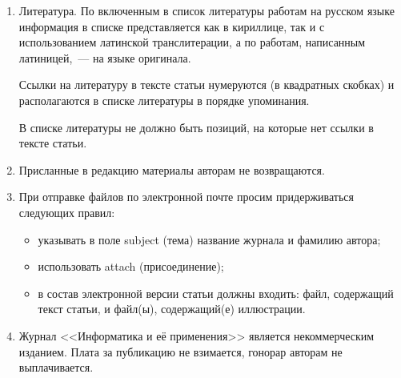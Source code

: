 {\begin{enumerate}[1.]
\begin{itemize}
\pagebreak  

\thispagestyle{empty}


\vspace*{-36pt}


\item сведения об авторах, в соответствии с форматом, образцы которого 
представлены на страницах: 

{\sf http://www.ipiran.ru/journal/issues/2013\_07\_01/authors.asp}  и

 {\sf 
http://www.ipiran.ru/journal/issues/2013\_07\_01\_eng/authors.asp};

\item аннотация (не менее 100 слов на каждом из языков). Аннотация~--- это 
краткое резюме работы, которое может публиковаться отдельно. Она является 
основным источником информации в информационных системах и базах данных; 
Английская аннотация должна быть оригинальной, может не быть дословным 
переводом русского текста и должна быть написана хорошим английским языком.
\item ключевые слова, желательно из принятых в мировой научно-технической 
литературе тематических тезаурусов. Предложения не могут быть ключевыми 
словами.
\end{itemize}

\item Литература. По включенным в список литературы работам на русском языке 
информация в списке представляется как в кириллице, так и с использованием латинской 
транслитерации, а по работам, написанным латиницей,~--- на языке оригинала. 

Ссылки на литературу в тексте статьи нумеруются (в квадратных скобках) и 
располагаются в списке литературы в порядке упоминания.  

В списке литературы не должно быть позиций, на которые нет ссылки в тексте статьи.  

\item Присланные в редакцию материалы авторам не возвращаются. 

\item При отправке файлов по электронной почте просим придерживаться следующих 
правил: 
\begin{itemize}
\item указывать в поле subject (тема) название журнала и фамилию автора; 
\item использовать attach (присоединение); 
\item в состав электронной версии статьи должны входить: файл, содержащий 
текст статьи, и файл(ы), содержащий(е) иллюстрации. 
\end{itemize}
\item  Журнал <<Информатика и её применения>> является некоммерческим изданием. 
Плата за публикацию не взимается, гонорар авторам не выплачивается. 
\end{enumerate}


}

